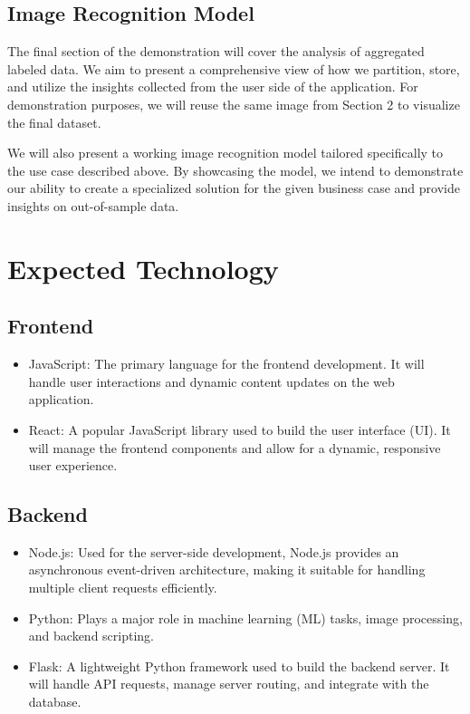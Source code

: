 \documentclass{article}
\begin{document}
\subsection{Image Recognition Model}

The final section of the demonstration will cover the analysis of aggregated labeled data. We aim to present a comprehensive view of how we partition, store, and utilize the insights collected from the user side of the application. For demonstration purposes, we will reuse the same image from Section 2 to visualize the final dataset.

We will also present a working image recognition model tailored specifically to the use case described above. By showcasing the model, we intend to demonstrate our ability to create a specialized solution for the given business case and provide insights on out-of-sample data.


  \section{Expected Technology}

  \subsection{Frontend}
  \begin{itemize}
      \item JavaScript: The primary language for the frontend development. It will handle user interactions and dynamic content updates on the web application.
  
      \item React: A popular JavaScript library used to build the user interface (UI). It will manage the frontend components and allow for a dynamic, responsive user experience.
  \end{itemize}
  
  \subsection{Backend}
  \begin{itemize}
      \item Node.js: Used for the server-side development, Node.js provides an asynchronous event-driven architecture, making it suitable for handling multiple client requests efficiently.
      \item Python: Plays a major role in machine learning (ML) tasks, image processing, and backend scripting.
      \item Flask: A lightweight Python framework used to build the backend server. It will handle API requests, manage server routing, and integrate with the database.
  \end{itemize}
  
\end{document}
